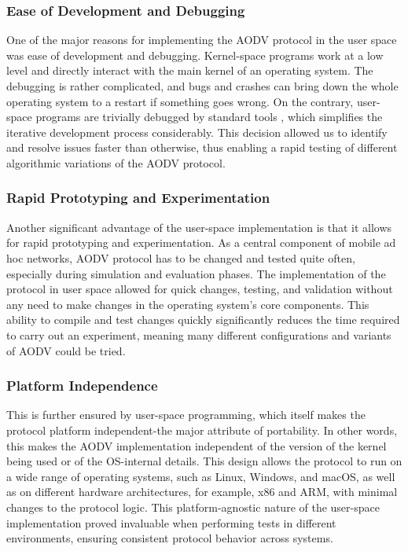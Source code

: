 \documentclass[]{nsm-thesis}
\begin{document}
\subsubsection{Ease of Development and Debugging}
One of the major reasons for implementing the AODV protocol in the user space was ease of development and debugging. Kernel-space programs work at a low level and directly interact with the main kernel of an operating system. The debugging is rather complicated, and bugs and crashes can bring down the whole operating system to a restart if something goes wrong. On the contrary, user-space programs are trivially debugged by standard tools , which simplifies the iterative development process considerably. This decision allowed us to identify and resolve issues faster than otherwise, thus enabling a rapid testing of different algorithmic variations of the AODV protocol.
\subsubsection{Rapid Prototyping and Experimentation}
Another significant advantage of the user-space implementation is that it allows for rapid prototyping and experimentation. As a central component of mobile ad hoc networks, AODV protocol has to be changed and tested quite often, especially during simulation and evaluation phases. The implementation of the protocol in user space allowed for quick changes, testing, and validation without any need to make changes in the operating system's core components. This ability to compile and test changes quickly significantly reduces the time required to carry out an experiment, meaning many different configurations and variants of AODV could be tried.
\subsubsection{Platform Independence}
This is further ensured by user-space programming, which itself makes the protocol platform independent-the major attribute of portability. In other words, this makes the AODV implementation independent of the version of the kernel being used or of the OS-internal details. This design allows the protocol to run on a wide range of operating systems, such as Linux, Windows, and macOS, as well as on different hardware architectures, for example, x86 and ARM, with minimal changes to the protocol logic. This platform-agnostic nature of the user-space implementation proved invaluable when performing tests in different environments, ensuring consistent protocol behavior across systems.
\end{document}
